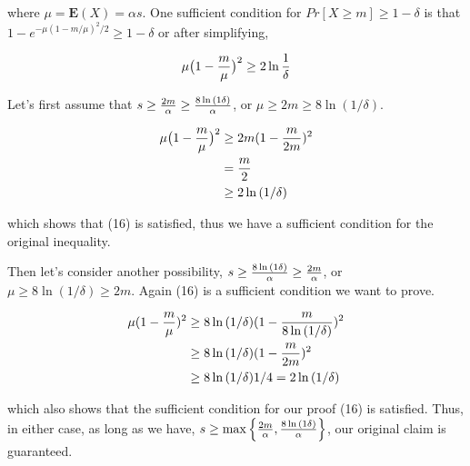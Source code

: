 \documentclass[11pt]{537homework}
\begin{document}
where $\mu = \mathbf{E}(X) = \alpha s$. One sufficient condition for $Pr[X \geq m] \geq 1 - \delta$ is that $1 - e^{-\mu (1-m/\mu)^2/2} \geq 1 - \delta$ or after simplifying, 

\begin{align}
  \mu\big( 1 - {m \over \mu} \big)^2 \geq 2 \ln{{1 \over \delta}}
\end{align}



Let's first assume that $s \geq {2m \over \alpha} \geq {8 \ln{(1\delta)} \over \alpha}$, or $\mu \geq 2m \geq 8 \ln{(1/\delta)}$. 

\begin{align}
  \mu\big( 1 - {m \over \mu} \big)^2  & \geq 2m(1 - {m \over 2m})^2 \\
                                      & = {m \over 2} \\
                                      & \geq 2\ln{(1/\delta)}
\end{align}

which shows that (16) is satisfied, thus we have a sufficient condition for the original inequality. 

Then let's consider another possibility, $s  \geq {8 \ln{(1\delta)} \over \alpha}\geq {2m \over \alpha}$, or $\mu \geq 8 \ln{(1/\delta)}\geq 2m$. Again (16) is a sufficient condition we want to prove. 

\begin{align}
  \mu(1 - {m \over \mu})^2 & \geq 8\ln{(1/\delta)}(1 - {m \over 8 \ln{(1/\delta)}})^2 \\ 
  & \geq 8\ln{(1/\delta)}(1 - {m \over 2m})^2 \\
  & \geq 8\ln{(1/\delta)}1/4 = 2\ln{(1/\delta)}
\end{align}

which also shows that the sufficient condition for our proof (16) is satisfied. Thus, in either case, as long as we have, $s \geq \max{\Big\{{2m \over \alpha}}, {8 \ln{(1\delta)} \over \alpha} \Big\}$, our original claim is guaranteed. 
\end{document}
